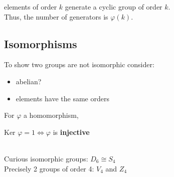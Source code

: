 \documentclass[12pt]{article}
\begin{document}
\textcolor[gray]{0.5}{elements of order $k$ generate a cyclic group of order $k$.\\ Thus, the number of generators is $\varphi(k)$.}


\subsection*{Isomorphisms}

To show two groups are not isomorphic consider: 
\begin{itemize}
    \item abelian?
    \item elements have the same orders
\end{itemize}

\noindent For $\varphi$ a homomorphism,\\
\centerline{ Ker $\varphi = 1 \iff \varphi$ is \textbf{injective} }
\ \\

Curious isomorphic groups: $D_6 \cong S_4$\\

Precisely 2 groups of order 4: $V_4$ and $Z_4$
\end{document}
